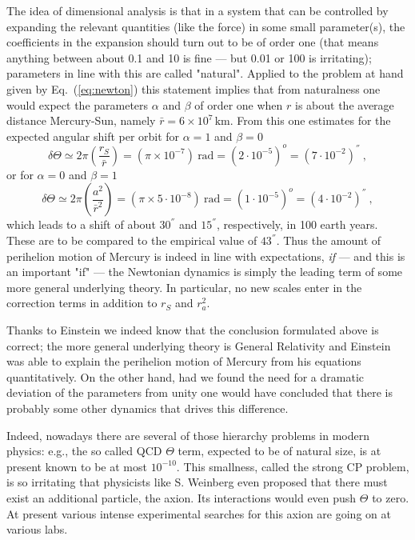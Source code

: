 \documentclass[12pt,ngerman,american]{iopart}
\begin{document}
The idea of dimensional analysis is that in a system that can be controlled by expanding the relevant quantities (like the force) in some small parameter(s), the coefficients in the expansion should turn out to be of order one (that means anything between about 0.1 and 10 is fine --- but 0.01 or 100 is irritating); parameters in line with this are called "natural".
Applied to the problem at hand given by Eq.~(\ref{eq:newton}) this statement implies that from naturalness one would expect the parameters $\alpha$ and $\beta$ of order one when $r$ is about the average distance Mercury-Sun, namely $\bar r=6\times 10^7\,\mathrm{km}$.
From this one estimates for the expected angular shift per orbit for $\alpha=1$ and $\beta=0$
\begin{equation}
\delta \Theta \simeq 2\pi\left(\frac{r_S}{\bar r}\right) = (\pi \times 10^{-7}) \ \mbox{rad} = (2\cdot 10^{-5})^o = (7\cdot 10^{-2}) ^{''} \ ,
\end{equation}
or for $\alpha=0$ and $\beta=1$
\begin{equation}
\delta \Theta \simeq 2\pi\left(\frac{a^2}{\bar r^2}\right) = (\pi \times 5 \cdot 10^{-8}) \ \mbox{rad} = (1 \cdot 10^{-5})^o = (4\cdot 10^{-2}) ^{''} \ ,
\end{equation}
which leads to a shift of about $30^{''}$ and $15^{''}$, respectively, in 100 earth years. These are to be compared to the empirical value of $43^{''}$.
Thus the amount of perihelion motion of Mercury is indeed in line with expectations, \textit{if} --- and this is an important "if" --- the Newtonian dynamics is simply the leading term of some more general underlying theory.
In particular, no new scales enter in the correction terms in addition to $r_S$ and $r_a^2$.

Thanks to Einstein we indeed know that the conclusion formulated above is correct; the more general underlying theory is General Relativity and Einstein was able to explain the perihelion motion of Mercury from his equations quantitatively.
On the other hand, had we found the need for a dramatic deviation of the parameters from unity one would have concluded that there is probably some other dynamics that drives this difference.

Indeed, nowadays there are  several of those hierarchy problems in modern physics: e.g., the so called QCD $\Theta$ term, expected to be of natural size, is at present known to be at most $10^{-10}$.
This smallness, called the strong CP problem, is so irritating that physicists like S. Weinberg even proposed that there must exist an additional particle, the axion.
Its interactions would even push $\Theta$ to zero.
At present various intense experimental searches for this axion are going on at various labs.
\end{document}
